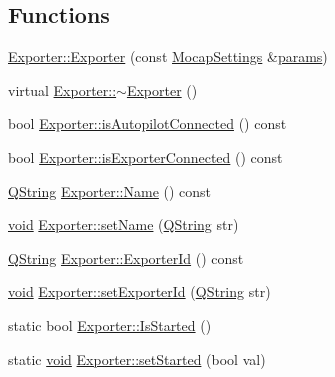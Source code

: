 \subsection*{Functions}
\begin{DoxyCompactItemize}
\item 
\hyperlink{group___mo_cap_plugin_ga3c11abedc19c26ed0e0212e152f10685}{Exporter\-::\-Exporter} (const \hyperlink{group___mo_cap_plugin_ga6083347a5b3eb70e360f599354dc0f0b}{Mocap\-Settings} \&\hyperlink{glext_8h_afeb6390ab3bc8a0e96a88aff34d52288}{params})
\item 
virtual \hyperlink{group___mo_cap_plugin_ga44f24686958e01a543fd8b68b392658a}{Exporter\-::$\sim$\-Exporter} ()
\item 
bool \hyperlink{group___mo_cap_plugin_gaec7e0cea763639d6f79c4f61e9e78375}{Exporter\-::is\-Autopilot\-Connected} () const 
\item 
bool \hyperlink{group___mo_cap_plugin_gad9cd5c117dc3025d1ef55ba560b9e7c4}{Exporter\-::is\-Exporter\-Connected} () const 
\item 
\hyperlink{group___u_a_v_objects_plugin_gab9d252f49c333c94a72f97ce3105a32d}{Q\-String} \hyperlink{group___mo_cap_plugin_gaad282295f6b9ba8910db1a11c56d1998}{Exporter\-::\-Name} () const 
\item 
\hyperlink{group___u_a_v_objects_plugin_ga444cf2ff3f0ecbe028adce838d373f5c}{void} \hyperlink{group___mo_cap_plugin_ga09d765021a9a03276d14769f3ab7c43d}{Exporter\-::set\-Name} (\hyperlink{group___u_a_v_objects_plugin_gab9d252f49c333c94a72f97ce3105a32d}{Q\-String} str)
\item 
\hyperlink{group___u_a_v_objects_plugin_gab9d252f49c333c94a72f97ce3105a32d}{Q\-String} \hyperlink{group___mo_cap_plugin_gaebb24e563941debf0abc1897ef3c89e3}{Exporter\-::\-Exporter\-Id} () const 
\item 
\hyperlink{group___u_a_v_objects_plugin_ga444cf2ff3f0ecbe028adce838d373f5c}{void} \hyperlink{group___mo_cap_plugin_gaf8c44fde7b72a5f5658d47408b806b62}{Exporter\-::set\-Exporter\-Id} (\hyperlink{group___u_a_v_objects_plugin_gab9d252f49c333c94a72f97ce3105a32d}{Q\-String} str)
\item 
static bool \hyperlink{group___mo_cap_plugin_ga4b693d27267a22d345082b85e2ebe71e}{Exporter\-::\-Is\-Started} ()
\item 
static \hyperlink{group___u_a_v_objects_plugin_ga444cf2ff3f0ecbe028adce838d373f5c}{void} \hyperlink{group___mo_cap_plugin_ga7b3b24d7f35ac822cf8414afbf88854d}{Exporter\-::set\-Started} (bool val)
\item 

\end{DoxyCompactItemize}
